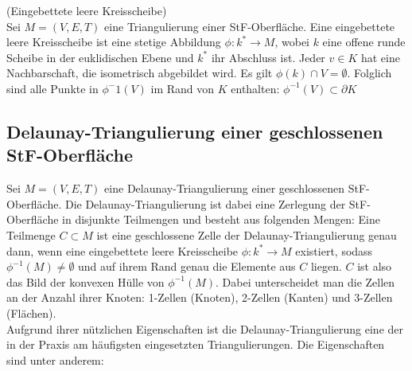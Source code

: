 \begin{definition}(Eingebettete leere Kreisscheibe)\\
Sei $M = (V,E,T)$ eine Triangulierung einer StF-Oberfläche.
Eine eingebettete leere Kreisscheibe ist eine stetige Abbildung $\phi: k^{\ast} \rightarrow M$, wobei $k$ eine offene runde Scheibe in der euklidischen Ebene und  $k^{\ast}$ ihr Abschluss ist.
Jeder $v \in K$ hat eine Nachbarschaft, die isometrisch abgebildet wird. Es gilt $\phi (k) \cap V = \emptyset $. Folglich sind alle Punkte in $\phi^-1(V)$ im Rand von $K$ enthalten: $\phi^{-1}(V) \subset \partial K $ 
\end{definition} 
 
 
 

\subsection*{Delaunay-Triangulierung einer geschlossenen StF-Oberfläche}
Sei $M = (V,E,T)$ eine Delaunay-Triangulierung einer geschlossenen StF-Oberfläche.
Die Delaunay-Triangulierung ist dabei eine Zerlegung der StF-Oberfläche in disjunkte Teilmengen und besteht aus folgenden Mengen: Eine Teilmenge $ C \subset M$ ist eine geschlossene Zelle der Delaunay-Triangulierung genau dann, wenn eine eingebettete leere Kreisscheibe $\phi: k^{\ast} \rightarrow M$ existiert, sodass $\phi^{-1}(M) \not = \emptyset$ und auf ihrem Rand genau die Elemente aus $C$ liegen. 
$C$ ist also das Bild der konvexen Hülle von $\phi^{-1}(M)$.
Dabei unterscheidet man die Zellen an der Anzahl ihrer Knoten: 1-Zellen (Knoten), 2-Zellen (Kanten) und 3-Zellen (Flächen).\\   

Aufgrund ihrer nützlichen Eigenschaften ist die  Delaunay-Triangulierung  eine der in der Praxis am häufigsten eingesetzten Triangulierungen. 
Die Eigenschaften sind unter anderem:

